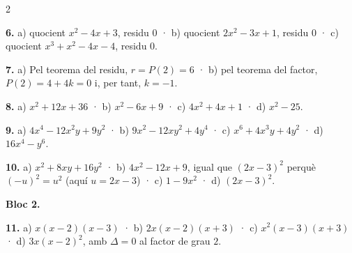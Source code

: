 \documentclass[13pt,a4paper]{extarticle}
\begin{document}
\begin{multicols}{2}
\begin{minipage}{\linewidth}
\textbf{6.} a) quocient $x^2-4x+3$, residu $0$ · b) quocient $2x^2-3x+1$, residu $0$ · c) quocient $x^3+x^2-4x-4$, residu $0$.\par
\end{minipage}\par\vspace{1.6mm}
\par\noindent\begin{minipage}{\linewidth}
\textbf{7.} a) Pel teorema del residu, $r=P(2)=6$ · b) pel teorema del factor, $P(2)=4+4k=0$ i, per tant, $k=-1$.\par
\end{minipage}\par\vspace{1.6mm}
\par\noindent\begin{minipage}{\linewidth}
\textbf{8.} a) $x^2+12x+36$ · b) $x^2-6x+9$ · c) $4x^2+4x+1$ · d) $x^2-25$.\par
\end{minipage}\par\vspace{1.6mm}
\par\noindent\begin{minipage}{\linewidth}
\textbf{9.} a) $4x^4-12x^2y+9y^2$ · b) $9x^2-12xy^2+4y^4$ · c) $x^6+4x^3y+4y^2$ · d) $16x^4-y^6$.\par
\end{minipage}\par\vspace{1.6mm}
\par\noindent\begin{minipage}{\linewidth}
\textbf{10.} a) $x^2+8xy+16y^2$ · b) $4x^2-12x+9$, igual que $(2x-3)^2$ perquè $(-u)^2=u^2$ (aquí $u=2x-3$) · c) $1-9x^2$ · d) $(2x-3)^2$.\par
\end{minipage}\par\vspace{1.6mm}
\textbf{Bloc 2.}\par
\par\noindent\begin{minipage}{\linewidth}
\textbf{11.} a) $x(x-2)(x-3)$ · b) $2x(x-2)(x+3)$ · c) $x^2(x-3)(x+3)$ · d) $3x(x-2)^2$, amb $\Delta=0$ al factor de grau $2$.\par
\end{minipage}\par\vspace{1.6mm}
\par\noindent\begin{minipage}{\linewidth}

\end{minipage}
\end{multicols}
\end{document}
